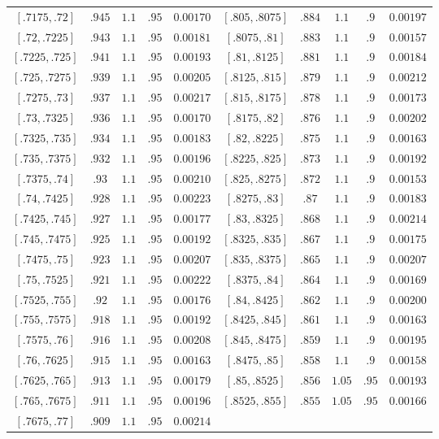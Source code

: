 \documentclass[11pt]{amsart}
\numberwithin{equation}{section}
\theoremstyle{plain}
\theoremstyle{definition}
\theoremstyle{remark}
\newcommand{\1}{\mathbf{1}}
\begin{document}
\begin{center}
\begin{longtable}{@{}ccccc@{\qquad}ccccc@{}}
$[.7175,.72]$ & $.945$ & $1.1$ & $.95$ & $0.00170$ & $[.805,.8075]$ & $.884$ & $1.1$ & $.9$ & $0.00197$ \\
$[.72,.7225]$ & $.943$ & $1.1$ & $.95$ & $0.00181$ & $[.8075,.81]$ & $.883$ & $1.1$ & $.9$ & $0.00157$ \\
$[.7225,.725]$ & $.941$ & $1.1$ & $.95$ & $0.00193$ & $[.81,.8125]$ & $.881$ & $1.1$ & $.9$ & $0.00184$ \\
$[.725,.7275]$ & $.939$ & $1.1$ & $.95$ & $0.00205$ & $[.8125,.815]$ & $.879$ & $1.1$ & $.9$ & $0.00212$ \\
$[.7275,.73]$ & $.937$ & $1.1$ & $.95$ & $0.00217$ & $[.815,.8175]$ & $.878$ & $1.1$ & $.9$ & $0.00173$ \\
$[.73,.7325]$ & $.936$ & $1.1$ & $.95$ & $0.00170$ & $[.8175,.82]$ & $.876$ & $1.1$ & $.9$ & $0.00202$ \\
$[.7325,.735]$ & $.934$ & $1.1$ & $.95$ & $0.00183$ & $[.82,.8225]$ & $.875$ & $1.1$ & $.9$ & $0.00163$ \\
$[.735,.7375]$ & $.932$ & $1.1$ & $.95$ & $0.00196$ & $[.8225,.825]$ & $.873$ & $1.1$ & $.9$ & $0.00192$ \\
$[.7375,.74]$ & $.93$ & $1.1$ & $.95$ & $0.00210$ & $[.825,.8275]$ & $.872$ & $1.1$ & $.9$ & $0.00153$ \\
$[.74,.7425]$ & $.928$ & $1.1$ & $.95$ & $0.00223$ & $[.8275,.83]$ & $.87$ & $1.1$ & $.9$ & $0.00183$ \\
$[.7425,.745]$ & $.927$ & $1.1$ & $.95$ & $0.00177$ & $[.83,.8325]$ & $.868$ & $1.1$ & $.9$ & $0.00214$ \\
$[.745,.7475]$ & $.925$ & $1.1$ & $.95$ & $0.00192$ & $[.8325,.835]$ & $.867$ & $1.1$ & $.9$ & $0.00175$ \\
$[.7475,.75]$ & $.923$ & $1.1$ & $.95$ & $0.00207$ & $[.835,.8375]$ & $.865$ & $1.1$ & $.9$ & $0.00207$ \\
$[.75,.7525]$ & $.921$ & $1.1$ & $.95$ & $0.00222$ & $[.8375,.84]$ & $.864$ & $1.1$ & $.9$ & $0.00169$ \\
$[.7525,.755]$ & $.92$ & $1.1$ & $.95$ & $0.00176$ & $[.84,.8425]$ & $.862$ & $1.1$ & $.9$ & $0.00200$ \\
$[.755,.7575]$ & $.918$ & $1.1$ & $.95$ & $0.00192$ & $[.8425,.845]$ & $.861$ & $1.1$ & $.9$ & $0.00163$ \\
$[.7575,.76]$ & $.916$ & $1.1$ & $.95$ & $0.00208$ & $[.845,.8475]$ & $.859$ & $1.1$ & $.9$ & $0.00195$ \\
$[.76,.7625]$ & $.915$ & $1.1$ & $.95$ & $0.00163$ & $[.8475,.85]$ & $.858$ & $1.1$ & $.9$ & $0.00158$ \\
$[.7625,.765]$ & $.913$ & $1.1$ & $.95$ & $0.00179$ & $[.85,.8525]$ & $.856$ & $1.05$ & $.95$ & $0.00193$ \\
$[.765,.7675]$ & $.911$ & $1.1$ & $.95$ & $0.00196$ & $[.8525,.855]$ & $.855$ & $1.05$ & $.95$ & $0.00166$ \\
$[.7675,.77]$ & $.909$ & $1.1$ & $.95$ & $0.00214$ & & & & & \\
\end{longtable}
\end{center}
\end{document}
